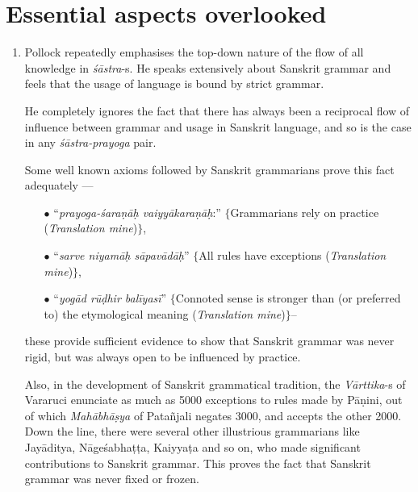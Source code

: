 \section*{Essential aspects overlooked}

\begin{enumerate}
\item Pollock repeatedly emphasises the top-down nature of the flow of all knowledge in {\it śāstra}-s. He speaks extensively about Sanskrit grammar and feels that the usage of language is bound by strict grammar. 

He completely ignores the fact that there has always been a reciprocal flow of influence between grammar and usage in Sanskrit language, and so is the case in any \textsl{śāstra-prayoga} pair. 

Some well known axioms followed by Sanskrit grammarians prove this fact adequately --- 
\begin{itemize}
\item[$\bullet$] ``\textsl{prayoga-śaraṇāḥ vaiyyākaraṇāḥ}:'' $\{$Grammarians rely on practice (\textsl{Translation mine})$\}$, 

\item[$\bullet$] ``\textsl{sarve niyamāḥ sāpavādāḥ}'' $\{$All rules have exceptions (\textsl{Translation mine})$\}$, 

\item[$\bullet$] ``\textsl{yogād rūḍhir balīyasī}'' $\{$Connoted sense is stronger than (or preferred to) the etymological meaning (\textsl{Translation mine})$\}$-- 
\end{itemize}

these provide sufficient evidence to show that Sanskrit grammar was never rigid, but was always open to be influenced by practice. 

Also, in the development of Sanskrit grammatical tradition, the  {\it Vārttika}-s of Vararuci enunciate as much as 5000 exceptions to rules made by Pāṇini, out of which {\it Mahābhāṣya} of Patañjali negates 3000, and accepts the other 2000. Down the line, there were several other illustrious grammarians like Jayāditya, Nāgeśabhaṭṭa, Kaiyyaṭa  and so on, who made significant contributions to Sanskrit grammar. This proves the fact that Sanskrit grammar  was never fixed or frozen.


\end{enumerate}
